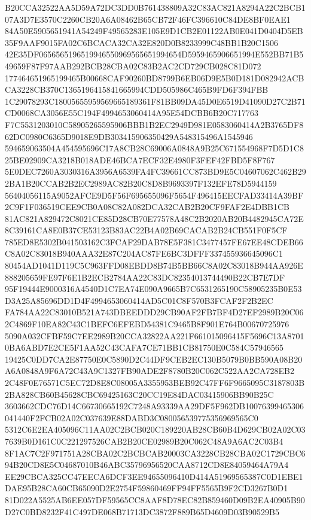 \documentclass[UTF8,fontset=fandol,zihao=-4,a4paper]{ctexart}
\begin{document}
{{B20CCA32522AA5D59A72DC3DD0B761438809A32C83AC821A8294A22C2BCB107A3D7E3570C2260CB20A6A08462B65CB72F46FC396610C84DE8BF0EAE1
84A50E5905651941A54249F49565283E105E9D1CB2E01122AB0E041D0404D5EB35F9AAF9015FA02C6BCACA32CA32E820D0B8233999C48BB1B20C1506
42E35DF0656565196519946550969565651994654D5959465906651994E552BB71B549659F87F97AAB292BCB28CBA02C83B2AC2CD729CB028C81D072
177464651965199465B00668CAF90260BD8799B6EB06D9E5B0D181D082942ACBCA3228CB370C1365196415841665994CDD505986C465B9FD6F394FBB
1C29078293C18005655959569665189361F81BB09DA45D0E6519D41090D27C2B71CD0068CA3056E55C194F4994653060414A95E54DCBB6B20C717763
F7C5531203010C58905265595906BBB1B2EC2949D981E0583060414A2B3765DF862DC0980C6365D9018E9DB303415906350429A548315496A1545946
594659063504A454595696C17A8CB28C69006A0848A9B25C671554968F7D5D1C825BE02909CA3218B018ADE46BCA7ECF32E4980F3FEF42FBD5F8F767
5E0DEC7260A3030316A3956A6539FA4FC39661CC873BD9E5C04607062C462B292BA1B20CCAB2B2EC2989AC82B20C8D8B9693397F132EFE78D5944159
56404056115A9052AFCE9D5F56F695655096F5654F496415EECFAD33414A39BF2C9F1F036519CEE9CB0A08C82A082DCA32CAB2B20CF9FAF2E4DBB1CB
81AC821A829472C8021CE85D28CB70E77578A48C2B2020AB20B4482945CA72E8C39161CA8E0B37CE53123B83AC22B4A02B69CACAB2B24CB551F0F5CF
785ED8E5302B041503162C3FCAF29DAB78E5F381C3477457FE67EE48CDEB66C8A02C83018B940AAA32E87C204AC87FE6BC3DFFF337455936645096C1
80454AD1041D119C5C963FFD08EBDD8B74B5BB66C8A02C83018B944AA926E888205659FE97F6E1B2ECB2784AA22C83DC82354013744490B22CB7E7DF
95F19444E9000316A4540D1C7EA74E090A9665B7C6531265190C58905235B0E53D3A25A85696DD1D4F4994653060414AD5C01C8F570B3FCAF2F2B2EC
FA784AA22C83010B521A743DBEEDDD29CB90AF2FB7BF4D27EF2989B20C062C4869F10EA82C43C1BEFC6EFEBD54381C9465B8F901E764B00670725976
5090A032CFBF59C7EE2989B20CCA32822AA221F661015096415F5696C13A87010BA6ABD7E2CE5F1AA52C43CAFA7CE71BB1CB81750E0C584C57946565
19425C0DD7CA2E87750E0C5890D2C44DF9CEB2EC130B5079B0BB590A08B20A6A0848A9F6A72C43A9C1327FB90ADE2F8780B20C062C522AA2CA728EB2
2C48F0E76571C5EC72D8E8C08005A3355953BEB92C47FF6F9665095C3187803B2BA828CB60B45628CBC69425163C20CC19E84DAC03415906BB90B25C
3603662CDC76D14C66730665192C7248A93339AA29DF5F962DB10076399465306041440F2FCB02A02C037639E88DABD3C080056539775356969565C0
5312C6E2EA405096C11AA02C2BCB020C189220AB28CB60B4D629CB02A02C037639B0D161C0C221297526CAB2B20CE02989B20C062C48A9A6AC2C03B4
8F1AC7C2F971751A28CBA02C2BCBCAB20003CA3228CB28CBA02C1729CBC694B20CD8E5C04687010B46ABC35796956520CAA8712CD8E84059464A79A4
EE29CBCA325CC47EECA6DCF3EE94655096410D414A51969565387C0D1EBE1DAE95B28CA60CB65090D2E2754F59860469FF94FF5565B9F2CD3267B0D1
81D022A5525AB6EE057DF59565CC8AAF8D78EC82B859460D09B2EA40905B90D27C0BD8232F41C497DE068B71713DC3872F889B65D4609D03B90529B5
}}
\end{document}

